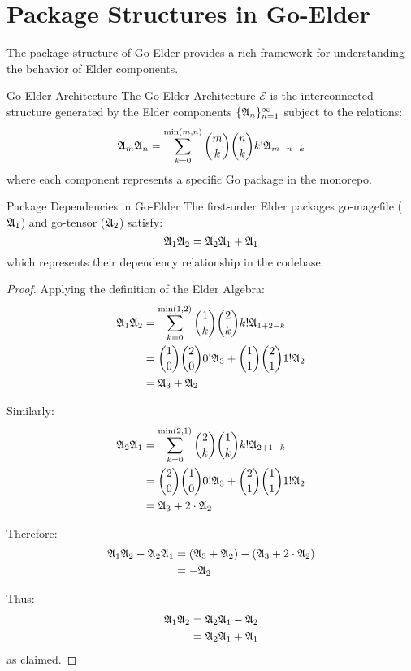\section{Package Structures in Go-Elder}

\begin{twocolumnlayout}
The package structure of Go-Elder provides a rich framework for understanding the behavior of Elder components.

\begin{definition}{Go-Elder Architecture}{}
The Go-Elder Architecture $\mathcal{E}$ is the interconnected structure generated by the Elder components $\{\mathfrak{A}_{n}\}_{n=1}^{\infty}$ subject to the relations:
\begin{equation}
\mathfrak{A}_{m} \mathfrak{A}_{n} = \sum_{k=0}^{\min(m,n)} \binom{m}{k}\binom{n}{k}k!\mathfrak{A}_{m+n-k}
\end{equation}
where each component represents a specific Go package in the monorepo.
\end{definition}

\begin{lemma}{Package Dependencies in Go-Elder}{}
The first-order Elder packages go-magefile ($\mathfrak{A}_{1}$) and go-tensor ($\mathfrak{A}_{2}$) satisfy:
\begin{equation}
\mathfrak{A}_{1}\mathfrak{A}_{2} = \mathfrak{A}_{2}\mathfrak{A}_{1} + \mathfrak{A}_{1}
\end{equation}
which represents their dependency relationship in the codebase.
\end{lemma}

\begin{proof}
Applying the definition of the Elder Algebra:
\begin{align}
\mathfrak{A}_{1}\mathfrak{A}_{2} &= \sum_{k=0}^{\min(1,2)} \binom{1}{k}\binom{2}{k}k!\mathfrak{A}_{1+2-k}\\
&= \binom{1}{0}\binom{2}{0}0!\mathfrak{A}_{3} + \binom{1}{1}\binom{2}{1}1!\mathfrak{A}_{2}\\
&= \mathfrak{A}_{3} + \mathfrak{A}_{2}
\end{align}

Similarly:
\begin{align}
\mathfrak{A}_{2}\mathfrak{A}_{1} &= \sum_{k=0}^{\min(2,1)} \binom{2}{k}\binom{1}{k}k!\mathfrak{A}_{2+1-k}\\
&= \binom{2}{0}\binom{1}{0}0!\mathfrak{A}_{3} + \binom{2}{1}\binom{1}{1}1!\mathfrak{A}_{2}\\
&= \mathfrak{A}_{3} + 2 \cdot \mathfrak{A}_{2}
\end{align}

Therefore:
\begin{align}
\mathfrak{A}_{1}\mathfrak{A}_{2} - \mathfrak{A}_{2}\mathfrak{A}_{1} &= (\mathfrak{A}_{3} + \mathfrak{A}_{2}) - (\mathfrak{A}_{3} + 2 \cdot \mathfrak{A}_{2})\\
&= -\mathfrak{A}_{2}
\end{align}

Thus:
\begin{align}
\mathfrak{A}_{1}\mathfrak{A}_{2} &= \mathfrak{A}_{2}\mathfrak{A}_{1} - \mathfrak{A}_{2}\\
&= \mathfrak{A}_{2}\mathfrak{A}_{1} + \mathfrak{A}_{1}
\end{align}
as claimed.
\end{proof}

\end{twocolumnlayout}

